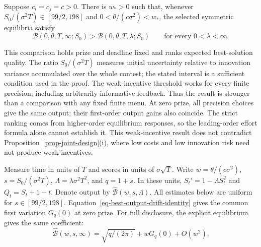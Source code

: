 \documentclass[mnsc]{informs3}
\begin{document}
\begin{APPENDICES}
{
\begin{lemma}\label{lem-design-weak-precision}
Suppose $c_i=c_j=c>0$. There is $w_*>0$ such that, whenever
$S_0/(\sigma^2T)\in[99/2,198]$ and $0<\theta/(c\sigma^2)<w_*$,
the selected symmetric equilibria satisfy
\begin{equation}\label{eq-design-uniform-weak-ranking}
\mathcal B(0,\theta,T,\infty;S_0)>
\mathcal B(0,\theta,T,\lambda;S_0)
\qquad\text{for every }0<\lambda<\infty.
\end{equation}
\end{lemma}

This comparison holds prize and deadline fixed and ranks expected best-solution quality. The ratio $S_0/(\sigma^2T)$ measures initial uncertainty relative to innovation variance accumulated over the whole contest; the stated interval is a sufficient condition used in the proof. The weak-incentive threshold works for every finite precision, including arbitrarily informative feedback. Thus the result is stronger than a comparison with any fixed finite menu. At zero prize, all precision choices give the same output; their first-order output gains also coincide. The strict ranking comes from higher-order equilibrium responses, so the leading-order effort formula alone cannot establish it. This weak-incentive result does not contradict Proposition~\ref{prop-joint-design}(i), where low costs and low innovation risk need not produce weak incentives.

Measure time in units of $T$ and scores in units of $\sigma\sqrt T$.
Write $w=\theta/(c\sigma^2)$, $s=S_0/(\sigma^2T)$,
$\Lambda=\lambda\sigma^2T^2$, and $q=1+s$. In these units,
$S_t'=1-\Lambda S_t^2$ and $Q_t=S_t+1-t$.
Denote output by $\widehat{\mathcal B}(w,s,\Lambda)$.
All estimates below are uniform for $s\in[99/2,198]$.
Equation~\eqref{eq-best-output-drift-identity} gives the common
first variation $G_q(0)$ at zero prize. For full disclosure, the
explicit equilibrium gives the same coefficient:
\begin{equation}\label{eq-design-full-first-variation}
\widehat{\mathcal B}(w,s,\infty)
=\sqrt{q/(2\pi)}+wG_q(0)+O(w^2).
\end{equation}

}
\end{APPENDICES}
\end{document}
